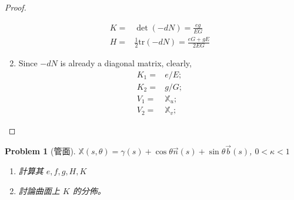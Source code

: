 \documentclass[10pt,a4paper]{article}
\newcounter{theProblemCounter}
\newtheorem{problem}[theProblemCounter]{Problem}
\begin{document}
\begin{proof}
\begin{enumerate}
\begin{align*}
K =& \det(-dN) = \frac{eg}{EG} \\
H =& \frac 12\text{tr}(-dN) = \frac{eG + gE}{2EG}
\end{align*}
\item[(b)]
Since $-dN$ is already a diagonal matrix, clearly, \begin{align*}
K_1 =& e/E; \\
K_2 =& g/G; \\
V_1 =& \mathbb{X}_u; \\
V_2 =& \mathbb{X}_v;
\end{align*}
\end{enumerate}
\end{proof}

\setcounter{theProblemCounter}{9}
\begin{problem}[管面]
$\mathbb{X}(s,\theta) = \gamma(s)+\cos\theta\vec{n}(s) + \sin\theta\vec{b}(s)$, $0<\kappa < 1$
\begin{enumerate}
\item[(a)] 計算其 $e, f, g, H, K$
\item[(b)] 討論曲面上 $K$ 的分佈。
\end{enumerate}
\end{problem}
\end{document}
